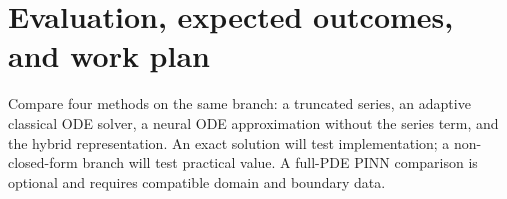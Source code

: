 \documentclass[12pt,a4paper]{article}
\begin{document}
\section{Evaluation, expected outcomes, and work plan}
Compare four methods on the same branch: a truncated series, an adaptive classical ODE solver, a neural ODE approximation without the series term, and the hybrid representation. An exact solution will test implementation; a non-closed-form branch will test practical value. A full-PDE PINN comparison is optional and requires compatible domain and boundary data.
\end{document}
